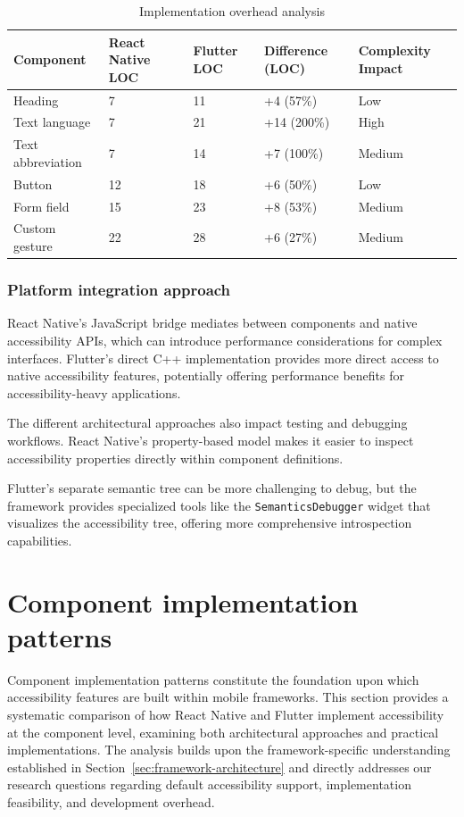 \begin{table}[ht]
\caption{Implementation overhead analysis}
\label{tab:implementation_overhead_analysis}
\centering
\begin{tabular}{|P{2.5cm}|P{2.5cm}|P{2.5cm}|P{2.5cm}|P{2.5cm}|}
\hline
\textbf{Component} & \textbf{React Native LOC} & \textbf{Flutter LOC} & \textbf{Difference (LOC)} & \textbf{Complexity Impact} \\
\hline
Heading & 7 & 11 & +4 (57\%) & Low \\
\hline
Text language & 7 & 21 & +14 (200\%) & High \\
\hline
Text abbreviation & 7 & 14 & +7 (100\%) & Medium \\
\hline
Button & 12 & 18 & +6 (50\%) & Low \\
\hline
Form field & 15 & 23 & +8 (53\%) & Medium \\
\hline
Custom gesture & 22 & 28 & +6 (27\%) & Medium \\
\hline
\end{tabular}
\end{table}

\subsubsection{Platform integration approach}
React Native's JavaScript bridge mediates between components and native accessibility APIs, which can introduce performance considerations for complex interfaces. Flutter's direct C++ implementation provides more direct access to native accessibility features, potentially offering performance benefits for accessibility-heavy applications.

The different architectural approaches also impact testing and debugging workflows. React Native's property-based model makes it easier to inspect accessibility properties directly within component definitions.

Flutter's separate semantic tree can be more challenging to debug, but the framework provides specialized tools like the \texttt{SemanticsDebugger} widget that visualizes the accessibility tree, offering more comprehensive introspection capabilities.

\section{Component implementation patterns}
\label{sec:component-implementation}

Component implementation patterns constitute the foundation upon which accessibility features are built within mobile frameworks. This section provides a systematic comparison of how React Native and Flutter implement accessibility at the component level, examining both architectural approaches and practical implementations. The analysis builds upon the framework-specific understanding established in Section~\ref{sec:framework-architecture} and directly addresses our research questions regarding default accessibility support, implementation feasibility, and development overhead.

